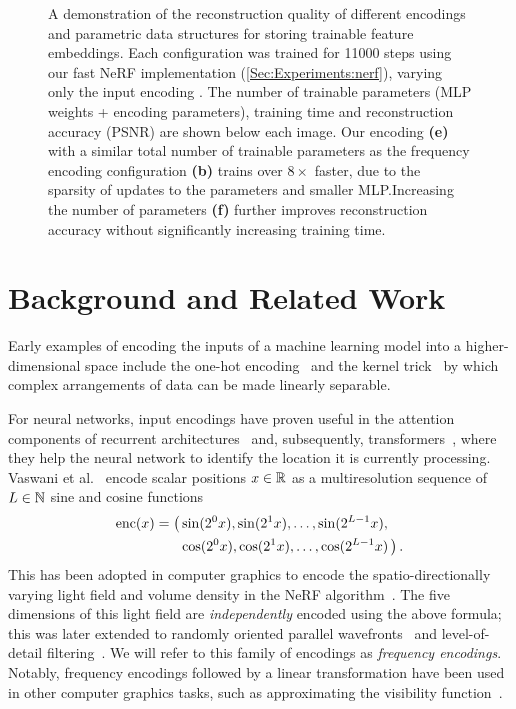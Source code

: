 \documentclass[acmtog,authorversion]{acmart}
\begin{document}
\begin{figure}
  \vspace{-2mm}
  
  \vspace{-2mm}
  \caption{\label{fig:grids}A demonstration of the reconstruction quality of different encodings and parametric data structures for storing trainable feature embeddings. Each configuration was trained for \num{11000} steps using our fast NeRF implementation (\autoref{Sec:Experiments:nerf}), varying only the input encoding . The number of trainable parameters (MLP weights + encoding parameters), training time and reconstruction accuracy (PSNR) are shown below each image. Our encoding \textbf{(e)} with a similar total number of trainable parameters as the frequency encoding configuration \textbf{(b)} trains over $8\times$ faster, due to the sparsity of updates to the parameters and smaller MLP.\@ Increasing the number of parameters \textbf{(f)} further improves reconstruction accuracy without significantly increasing training time.}\vspace{-3mm}
\end{figure}

\section{Background and Related Work} \label{Sec:RelatedWork}

Early examples of encoding the inputs of a machine learning model into a higher-dimensional space include the one-hot encoding~\cite{HARRIS201354} and the kernel trick~\citep{patternrecognition} by which complex arrangements of data can be made linearly separable.

For neural networks, input encodings have proven useful in the attention components of recurrent architectures~\cite{gehring2017convolutional} and, subsequently, transformers~\cite{vaswani2017attention}, where they help the neural network to identify the location it is currently processing.
Vaswani et al.~ encode scalar positions $x \in \mathbb{R}$ as a multiresolution sequence of ${L \in \mathbb{N}}$ sine and cosine functions
\begin{align}
  \mathrm{enc}(x) = \big( &\sin(2^0 x),  \sin(2^1 x),  \ldots, \sin(2^{L-1} x), \nonumber \\
  &\cos(2^0 x), \cos(2^1 x), \ldots, \cos(2^{L-1} x) \, \big) \,.
\end{align}
This has been adopted in computer graphics to encode the spatio-directionally varying light field and volume density in the NeRF algorithm~\cite{mildenhall2020nerf}.
The five dimensions of this light field are \emph{independently} encoded using the above formula; this was later extended to randomly oriented parallel wavefronts~\cite{tancik2020fourfeat} and level-of-detail filtering~\cite{barron2021mipnerf}.
We will refer to this family of encodings as \emph{frequency encodings}.
Notably, frequency encodings followed by a linear transformation have been used in other computer graphics tasks, such as approximating the visibility function~\citep{jansen2010fourier,annen2007convolutional}.
\end{document}
